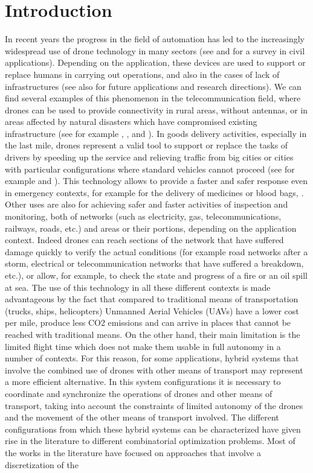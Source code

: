 \section{Introduction}
\noindent
In recent years the progress in the field of automation has led to the increasingly widespread use of drone technology in many sectors (see \cite{art:Otto18} and  \cite{art:Chung2020} for a survey in civil applications). Depending on the application, these devices are used to support or replace humans in carrying out operations, and also in the cases of lack of infrastructures (see \cite{art:Poikonen20a} also for future applications and research directions). We can find several examples of this phenomenon in the telecommunication field, where drones can be used to provide connectivity in rural areas, without antennas, or in areas affected by natural disasters which have compromised existing infrastructure (see for example \cite{art:Amorosi2019}, \cite{art:Chiaraviglio2019}, \cite{Jimenez2018} and \cite{art:Chiaraviglio2019a}). In goods delivery activities, especially in the last mile, drones represent a valid tool to support or replace the tasks of drivers by speeding up the service and relieving traffic from big cities or cities with particular configurations where standard vehicles cannot proceed (see for example \cite{art:Pugliese2017} and \cite{art:Amorosi2020}). This technology allows to provide a faster and safer response even in emergency contexts, for example for the delivery of medicines or blood bags, \cite{art:Wen2016}. Other uses are also for achieving safer and faster activities of inspection and monitoring, both of networks (such as electricity, gas, telecommunications, railways, roads, etc.) and areas or their portions, depending on the application context. Indeed drones can reach sections of the network that have suffered damage quickly  to verify the actual conditions (for example road networks after a storm, electrical or telecommunication networks that have suffered a breakdown, etc.), or allow, for example, to check the state and progress of a fire or an oil spill at sea. The use of this technology in all these different contexts is made advantageous by the fact that compared to traditional means of transportation (trucks, ships, helicopters) Unmanned Aerial Vehicles (UAVs) have a lower cost per mile, produce less CO2 emissions and can arrive in places that cannot be reached with traditional means. On the other hand, their main limitation is the limited flight time which does not make them usable in full autonomy in a number of contexts. For this reason, for some applications, hybrid systems that involve the combined use of drones with other means of transport may represent a more efficient alternative. In this system configurations it is necessary to coordinate and synchronize the operations of drones and other means of transport, taking into account the constraints of limited autonomy of the drones and the movement of the other means of transport involved. The different configurations from which these hybrid systems can be characterized have given rise in the literature to different combinatorial optimization problems. Most of the works in the literature have focused on approaches that involve a discretization of the 